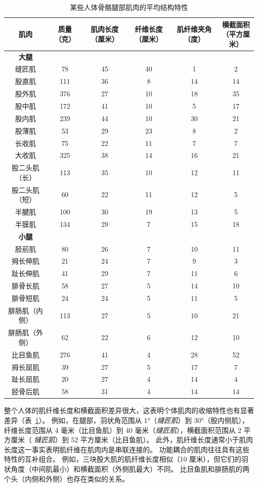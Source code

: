 \begin{table}[htbp]
	\caption{某些人体骨骼腿部肌肉的平均结构特性\label{tab:31_2}}
	\centering
	\begin{tabular}{cccccc}
		\toprule
		肌肉 & 质量（克） & 肌肉长度（厘米） & 纤维长度（厘米） & 肌纤维夹角（度） & \makecell[l]{横截面积\\（平方厘米）} \\
		\midrule
		\textbf{大腿} &   &  & & & \\
		缝匠肌 & 78 & 45 & 40 & 1 & 2 \\
		股直肌 & 111 & 36 & 8 & 14 & 14 \\
		股外肌 & 376 & 27 & 10 & 18 & 35 \\
		股中肌 & 172 & 41 & 10 & 5 & 17 \\
		股内肌 & 239 & 44 & 10 & 30 & 21 \\
		股薄肌 & 53 & 29 & 23 & 8 & 2 \\
		长收肌 & 75 & 22 & 11 & 7 & 7 \\
		大收肌 & 325 & 38 & 14 & 16 & 21 \\
		股二头肌（长） & 113 & 35 & 10 & 12 & 11 \\
		股二头肌（短） & 60 & 22 & 11 & 12 & 5 \\
		半腱肌 & 100 & 30 & 19 & 13 & 5 \\
		半膜肌 & 134 & 29 & 7 & 15 & 18 \\
		\textbf{小腿} &   &  & & & \\
		胫前肌 & 80 & 26 & 7 & 10 & 11 \\
		拇长伸肌 & 21 & 24 & 7 & 9 & 3 \\
		趾长伸肌 & 41 & 29 & 7 & 11 & 6 \\
		腓骨长肌 & 58 & 27 & 5 & 14 & 10 \\
		腓骨短肌 & 24 & 24 & 5 & 11 & 5 \\
		腓肠肌（内侧） & 113 & 27 & 5 & 10 & 21 \\
		腓肠肌（外侧） & 62 & 22 & 6 & 12 & 10 \\
		比目鱼肌 & 276 & 41 & 4 & 28 & 52 \\
		拇长屈肌 & 39 & 27 & 5 & 17 & 7 \\
		趾长屈肌 & 20 & 27 & 4 & 14 & 4 \\
		胫骨后肌 & 58 & 31 & 4 & 14 & 14 \\
		\bottomrule
	\end{tabular}
\end{table}


整个人体的肌纤维长度和横截面积差异很大，这表明个体肌肉的收缩特性也有显著差异（表~\ref{tab:31_2}）。
例如，在腿部，羽状角范围从 1°（\textit{缝匠肌}）到 30°（股内侧肌），纤维长度范围从 4 毫米（比目鱼肌）到 40 毫米（\textit{缝匠肌}），横截面积范围从 2 平方厘米（ \textit{缝匠肌}）到 52 平方厘米（比目鱼肌）。
此外，肌纤维长度通常小于肌肉长度这一事实表明肌纤维在肌肉内是串联连接的。
功能耦合的肌肉往往具有这些特性的互补组合。
例如，三块股大肌的肌纤维长度相似（10 厘米），但它们的羽状角度（中间肌最小）和横截面积（外侧肌最大）不同。
比目鱼肌和腓肠肌的两个头（内侧和外侧）也存在类似的关系。


